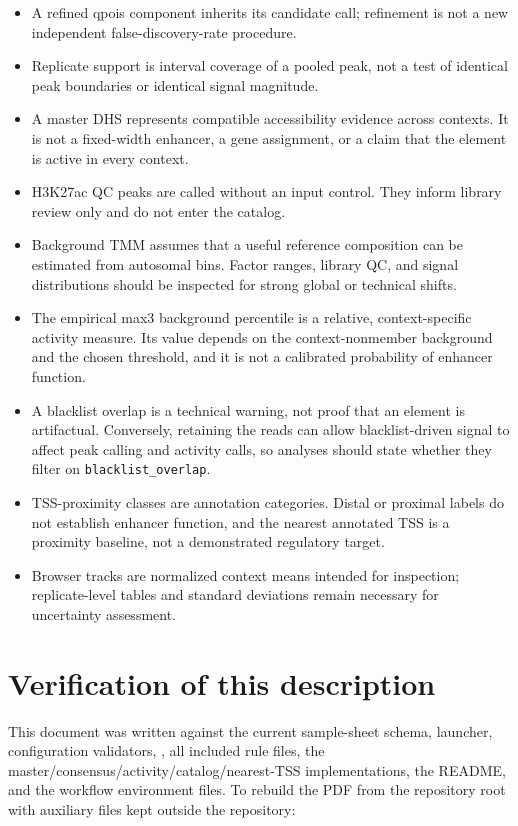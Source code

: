 \documentclass[11pt]{article}
\newcommand{\filep}[1]{\path{#1}}
\begin{document}
\begin{itemize}
  \item A refined qpois component inherits its candidate call; refinement is
  not a new independent false-discovery-rate procedure.
  \item Replicate support is interval coverage of a pooled peak, not a test of
  identical peak boundaries or identical signal magnitude.
  \item A master DHS represents compatible accessibility evidence across
  contexts.  It is not a fixed-width enhancer, a gene assignment, or a claim
  that the element is active in every context.
  \item H3K27ac QC peaks are called without an input control.  They inform
  library review only and do not enter the catalog.
  \item Background TMM assumes that a useful reference composition can be
  estimated from autosomal bins.  Factor ranges, library QC, and signal
  distributions should be inspected for strong global or technical shifts.
  \item The empirical max3 background percentile is a relative,
  context-specific activity measure.  Its value depends on the
  context-nonmember background and the chosen threshold, and it is not a
  calibrated probability of enhancer function.
  \item A blacklist overlap is a technical warning, not proof that an element
  is artifactual.  Conversely, retaining the reads can allow blacklist-driven
  signal to affect peak calling and activity calls, so analyses should state
  whether they filter on \texttt{blacklist\_overlap}.
  \item TSS-proximity classes are annotation categories.  Distal or proximal
  labels do not establish enhancer function, and the nearest annotated TSS is
  a proximity baseline, not a demonstrated regulatory target.
  \item Browser tracks are normalized context means intended for inspection;
  replicate-level tables and standard deviations remain necessary for
  uncertainty assessment.
\end{itemize}

\section{Verification of this description}

This document was written against the current sample-sheet schema, launcher,
configuration validators, \filep{workflow/Snakefile}, all included rule files,
the master/consensus/activity/catalog/nearest-TSS implementations, the README,
and the workflow environment files.  To rebuild the PDF from the repository
root with auxiliary files kept outside the repository:
\end{document}
